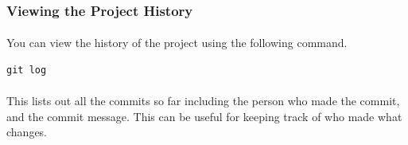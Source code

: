 \documentclass[11pt]{article}
\begin{document}
\subsubsection{Viewing the Project History}
\paragraph{}
You can view the history of the project using the following command.
\begin{lstlisting}
git log
\end{lstlisting}
\paragraph{}
This lists out all the commits so far including the person who made the commit, and the commit message. This can be useful for keeping track of who made what changes.
\end{document}
